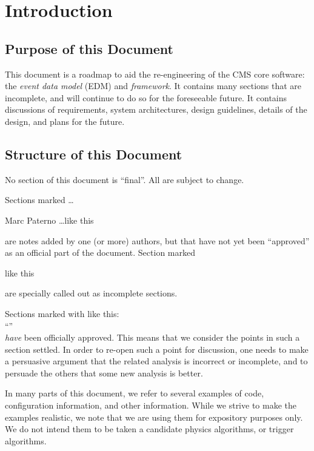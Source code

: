 \documentclass[draftmode]{memarticle}
\begin{document}
\topmatter

\chapter{Introduction}
\section{Purpose of this Document}

This document is a roadmap to aid the re-engineering of the CMS core software:
the \emph{event data model} (EDM) and \emph{framework}.
It contains many sections that are incomplete,
and will continue to do so for the foreseeable future.
It contains discussions of requirements,
system architectures,
design guidelines,
details of the design, and
plans for the future.

\section{Structure of this Document}

No section of this document is ``final''.
All are subject to change.

Sections marked \ldots
\begin{signednote}{Marc Paterno}
\ldots like this
\end{signednote}
\noindent
are notes added by one (or more) authors,
but that have not yet been ``approved'' as an official part of the document.
Section marked
\begin{fixme}
like this
\end{fixme}
are specially called out as incomplete sections.

Sections marked with like this: \\%
``'' \\%
\emph{have} been officially approved.
This means that we consider the points in such a section settled.
In order to re-open such a point for discussion,
one needs to make a persuasive argument
that the related analysis is incorrect or incomplete,
and to persuade the others that some new analysis
is better.

In many parts of this document,
we refer to several examples
of code,
configuration information,
and other information.
While we strive to make the examples realistic,
we note that we are using them for expository purposes only.
We do not intend them to be taken a candidate physics algorithms,
or trigger algorithms.
\end{document}
